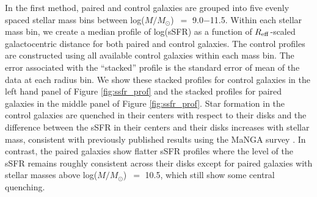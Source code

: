 \documentclass[iop,revtex4,twocolumn,apj,numberedappendix,appendixfloats]{emulateapj}
\newcommand{\reff}{$R_{\rm eff}$}
\newcommand{\logm}{log($M/M_{\odot}$)}
\begin{document}
In the first method, paired and control galaxies are grouped into five evenly spaced stellar mass bins between \logm\ $=$ 9.0$-$11.5. Within each stellar mass bin, we create a median profile of log(sSFR) as a function of \reff-scaled galactocentric distance for both paired and control galaxies. The control profiles are constructed using all available control galaxies within each mass bin. The error associated with the ``stacked'' profile is the standard error of mean of the data at each radius bin. We show these stacked profiles for control galaxies in the left hand panel of Figure \ref{fig:ssfr_prof} and the stacked profiles for paired galaxies in the middle panel of Figure \ref{fig:ssfr_prof}. Star formation in the control galaxies are quenched in their centers with respect to their disks and the difference between the sSFR in their centers and their disks increases with stellar mass, consistent with previously published results using the MaNGA survey \citep{Belfiore:2018}. In contrast, the paired galaxies show flatter sSFR profiles where the level of the sSFR remains roughly consistent across their disks except for paired galaxies with stellar masses above \logm\ $=$ 10.5, which still show some central quenching. 

\end{document}
